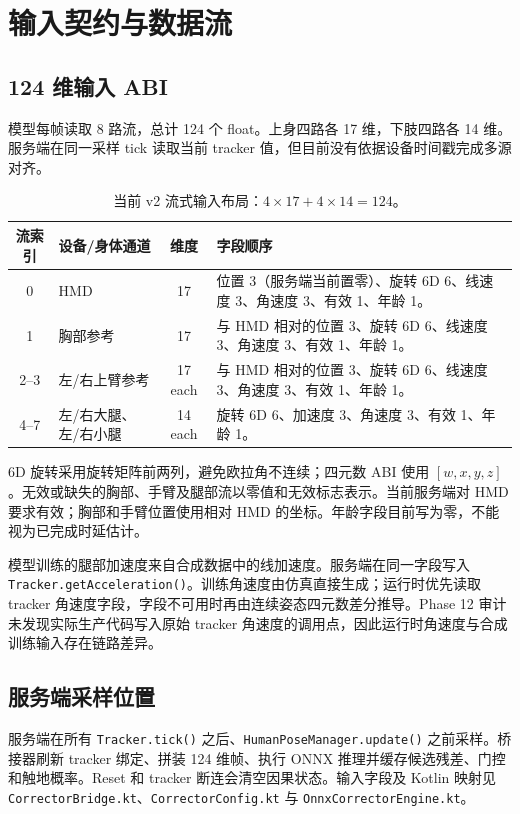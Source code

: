 \documentclass[UTF8,11pt,a4paper]{ctexart}
\begin{document}
\section{输入契约与数据流}

\subsection{124 维输入 ABI}
模型每帧读取 8 路流，总计 124 个 float。上身四路各 17 维，下肢四路各 14 维。服务端在同一采样 tick 读取当前 tracker 值，但目前没有依据设备时间戳完成多源对齐。

\begin{table}[H]
\centering
\small
\begin{tabular}{c>{\raggedright\arraybackslash}p{3.1cm}c>{\raggedright\arraybackslash}p{8.2cm}}
\toprule
流索引 & 设备/身体通道 & 维度 & 字段顺序\\
\midrule
0 & HMD & 17 & 位置 3（服务端当前置零）、旋转 6D 6、线速度 3、角速度 3、有效 1、年龄 1。\\
1 & 胸部参考 & 17 & 与 HMD 相对的位置 3、旋转 6D 6、线速度 3、角速度 3、有效 1、年龄 1。\\
2--3 & 左/右上臂参考 & 17 each & 与 HMD 相对的位置 3、旋转 6D 6、线速度 3、角速度 3、有效 1、年龄 1。\\
4--7 & 左/右大腿、左/右小腿 & 14 each & 旋转 6D 6、加速度 3、角速度 3、有效 1、年龄 1。\\
\bottomrule
\end{tabular}
\caption{当前 v2 流式输入布局：\(4\times17+4\times14=124\)。}
\end{table}

6D 旋转采用旋转矩阵前两列，避免欧拉角不连续；四元数 ABI 使用 \([w,x,y,z]\)。无效或缺失的胸部、手臂及腿部流以零值和无效标志表示。当前服务端对 HMD 要求有效；胸部和手臂位置使用相对 HMD 的坐标。年龄字段目前写为零，不能视为已完成时延估计。

模型训练的腿部加速度来自合成数据中的线加速度。服务端在同一字段写入 \texttt{Tracker.getAcceleration()}。训练角速度由仿真直接生成；运行时优先读取 tracker 角速度字段，字段不可用时再由连续姿态四元数差分推导。Phase 12 审计未发现实际生产代码写入原始 tracker 角速度的调用点，因此运行时角速度与合成训练输入存在链路差异。

\subsection{服务端采样位置}
服务端在所有 \texttt{Tracker.tick()} 之后、\texttt{HumanPoseManager.update()} 之前采样。桥接器刷新 tracker 绑定、拼装 124 维帧、执行 ONNX 推理并缓存候选残差、门控和触地概率。Reset 和 tracker 断连会清空因果状态。输入字段及 Kotlin 映射见 \texttt{CorrectorBridge.kt}、\texttt{CorrectorConfig.kt} 与 \texttt{OnnxCorrectorEngine.kt}。
\end{document}
